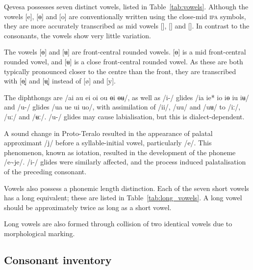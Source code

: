 \documentclass[grammar]{subfiles}
\begin{document}
  Qevesa possesses seven distinct vowels, listed in Table~\ref{tab:vowels}. Although the vowels [e], [ɵ] and [o] are conventionally written using the close-mid \textsc{ipa} symbols, they are more accurately transcribed as mid vowels [], [] and []. In contrast to the consonants, the vowels show very little variation.

  The vowels [ɵ] and [ʉ] are front-central rounded vowels. [ɵ] is a mid front-central rounded vowel, and [ʉ] is a close front-central rounded vowel. As these are both typically pronounced closer to the centre than the front, they are transcribed with [ɵ̟] and [ʉ̟] instead of [ø] and [y].

  The diphthongs are /ai au ei oi ou ɵi ɵʉ/, as well as /i-/ glides /ia ie* io iɵ iu iʉ/ and /u-/ glides /ua ue ui uo/, with assimilation of /ii/, /uu/ and /uʉ/ to /iː/, /uː/ and /ʉː/. /u-/ glides may cause labialisation, but this is dialect-dependent.  

  A sound change in Proto-Teralo resulted in the appearance of palatal approximant /j/ before a syllable-initial vowel, particularly /e/. This phenomenon, known as iotation, resulted in the development of the phoneme /\superj e\textasciitilde je/. /i-/ glides were similarly affected, and the process induced palatalisation of the preceding consonant.

  Vowels also possess a phonemic length distinction. Each of the seven short vowels has a long equivalent; these are listed in Table~\ref{tab:long_vowels}. A long vowel should be approximately twice as long as a short vowel.

  Long vowels are also formed through collision of two identical vowels due to morphological marking.

  \subsection{Consonant inventory}
  \label{ssec:consonants}
\end{document}
